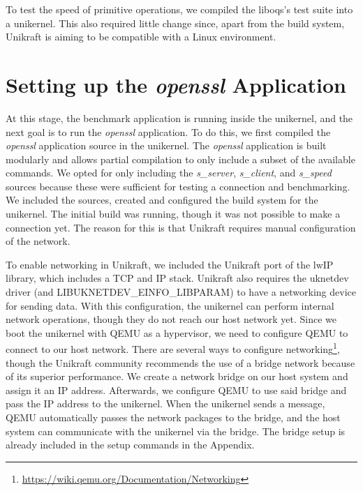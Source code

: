 \documentclass[public,noindent]{aisecreport}
\begin{document}
To test the speed of primitive operations, we compiled the liboqs's test suite into a unikernel. This also required little change since, apart from the build system, Unikraft is aiming to be compatible with a Linux environment. 

\section{Setting up the \textit{openssl} Application}

At this stage, the benchmark application is running inside the unikernel, and the next goal is to run the \textit{openssl} application. To do this, we first compiled the \textit{openssl} application source in the unikernel. The \textit{openssl} application is built modularly and allows partial compilation to only include a subset of the available commands. We opted for only including the \textit{s\_server}, \textit{s\_client}, and \textit{s\_speed} sources because these were sufficient for testing a connection and benchmarking. We included the sources, created and configured the build system for the unikernel. The initial build was running, though it was not possible to make a connection yet. The reason for this is that Unikraft requires manual configuration of the network. 

To enable networking in Unikraft, we included the Unikraft port of the lwIP library, which includes a TCP and IP stack. Unikraft also requires the uknetdev driver (and LIBUKNETDEV\_EINFO\_LIBPARAM) to have a networking device for sending data. With this configuration, the unikernel can perform internal network operations, though they do not reach our host network yet. Since we boot the unikernel with QEMU as a hypervisor, we need to configure QEMU to connect to our host network. There are several ways to configure networking\footnote{\url{https://wiki.qemu.org/Documentation/Networking}}, though the Unikraft community recommends the use of a bridge network because of its superior performance. We create a network bridge on our host system and assign it an IP address. Afterwards, we configure QEMU to use said bridge and pass the IP address to the unikernel. When the unikernel sends a message, QEMU automatically passes the network packages to the bridge, and the host system can communicate with the unikernel via the bridge. The bridge setup is already included in the setup commands in the Appendix. 
\end{document}

